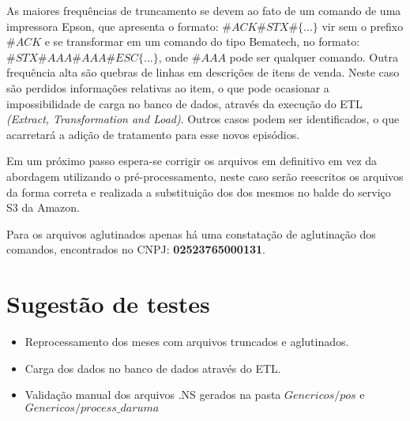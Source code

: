 \documentclass{article}      %
\begin{document}
As maiores frequências de truncamento se devem ao fato de um comando de uma impressora Epson, que apresenta o formato: $\#ACK\#STX\#\{...\}$ vir sem o prefixo $\#ACK$ e se transformar em um comando do tipo Bematech, no formato: $\#STX\#AAA\#AAA\#ESC\{...\}$, onde $\#AAA$ pode ser qualquer comando. Outra frequência alta são quebras de linhas em descrições de itens de venda. Neste caso são perdidos informações relativas ao item, o que pode ocasionar a impossibilidade de carga no banco de dados, através da execução do ETL \emph{(Extract, Transformation and Load)}. Outros casos podem ser identificados, o que acarretará a adição de tratamento para esse novos episódios.  

Em um próximo passo espera-se corrigir os arquivos em definitivo em vez da abordagem utilizando o pré-processamento, neste caso serão reescritos os arquivos da forma correta e realizada a substituição dos dos mesmos no balde do serviço S3 da Amazon. 

Para os arquivos aglutinados apenas há uma constatação de aglutinação dos comandos, encontrados no CNPJ: \textbf{02523765000131}.


\section{Sugestão de testes}

\begin{itemize}
    \item Reprocessamento dos meses com arquivos truncados e aglutinados.  
    \item Carga dos dados no banco de dados através do ETL.
    \item Validação manual dos arquivos .NS gerados na pasta $Genericos/pos$ e $Genericos/process\_daruma$
\end{itemize}



\end{document}
